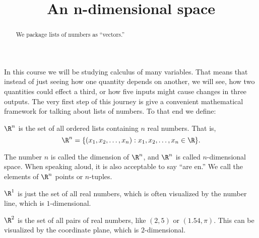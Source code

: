 \documentclass{ximera}
\title{An n-dimensional space}
\begin{document}
\begin{abstract}
  We package lists of numbers as ``vectors.''
\end{abstract}

In this course we will be studying calculus of many variables.  That
means that instead of just seeing how one quantity depends on another,
we will see, how two quantities could effect a third, or how five
inputs might cause changes in three outputs.  The very first step of
this journey is give a convenient mathematical framework for talking
about lists of numbers.  To that end we define:

\begin{definition}
  $\R^n$ is the set of all ordered lists containing $n$ real numbers.
  That is, \[\R^n = \{ (x_1,x_2,\dots, x_n) : x_1,x_2,\dots, x_n \in \R
  \}.\]
\end{definition}

The number $n$ is called the dimension of $\R^n$, and $\R^n$ is called $n$-dimensional space.  When speaking aloud, it is also acceptable to say ``are en.''
 We call the elements of $\R^n$ points or $n$-tuples.

\begin{example}
	$\R^1$ is just the set of all real numbers, which is often visualized by the number line, which is $1$-dimensional.
	
\end{example}

\begin{example}
	$\R^2$ is the set of all pairs of real numbers, like $(2,5)$ or $(1.54,\pi)$. This can be visualized by the coordinate plane, which is $2$-dimensional.
	
	
\end{example}
\end{document}
